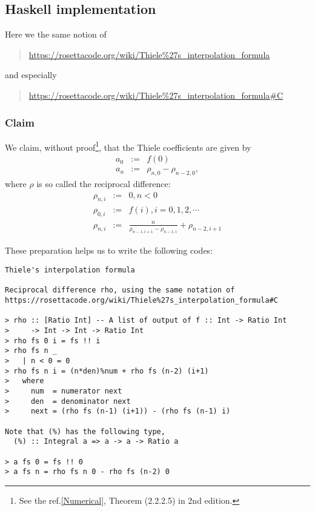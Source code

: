 \documentclass[11pt]{book}
\begin{document}
\subsection{Haskell implementation}
Here we the same notion of
\begin{quotation}
\url{https://rosettacode.org/wiki/Thiele%27s_interpolation_formula}
\end{quotation}
and especially
\begin{quotation}
\url{https://rosettacode.org/wiki/Thiele%27s_interpolation_formula#C}
\end{quotation}
 
\subsubsection{Claim}
We claim, without proof\footnote{
See the ref.\ref{Numerical}, Theorem (2.2.2.5) in 2nd edition.
}, that the Thiele coefficients are given by
\begin{eqnarray}
a_0 &:=& f(0) \\
a_n &:=& \rho_{n,0} - \rho_{{n-2},0},
\end{eqnarray}
where $\rho$ is so called the reciprocal difference:
\begin{eqnarray}
\rho_{n,i} &:=& 0, n<0 \\
\rho_{0,i} &:=& f(i), i=0,1,2,\cdots \\
\rho_{n,i} &:=& \frac{n}{\rho_{{n-1}, i+1} - \rho_{{n-1},i}} + \rho_{{n-2},i+1}
\end{eqnarray}

These preparation helps us to write the following codes:
\begin{verbatim}
Thiele's interpolation formula

Reciprocal difference rho, using the same notation of 
https://rosettacode.org/wiki/Thiele%27s_interpolation_formula#C

> rho :: [Ratio Int] -- A list of output of f :: Int -> Ratio Int
>     -> Int -> Int -> Ratio Int
> rho fs 0 i = fs !! i
> rho fs n _ 
>   | n < 0 = 0
> rho fs n i = (n*den)%num + rho fs (n-2) (i+1)
>   where
>     num  = numerator next
>     den  = denominator next
>     next = (rho fs (n-1) (i+1)) - (rho fs (n-1) i)

Note that (%) has the following type,
  (%) :: Integral a => a -> a -> Ratio a

> a fs 0 = fs !! 0
> a fs n = rho fs n 0 - rho fs (n-2) 0
\end{verbatim}
\end{document}
